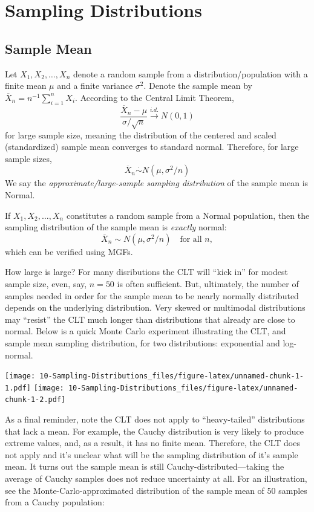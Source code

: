 \documentclass[
]{book}
\begin{document}
\hypertarget{sampling-distributions}{%
\chapter{Sampling Distributions}\label{sampling-distributions}}

\hypertarget{sample-mean}{%
\section{Sample Mean}\label{sample-mean}}

Let \(X_1, X_2, \ldots, X_n\) denote a random sample from a distribution/population with a finite mean \(\mu\) and a finite variance \(\sigma^2\). Denote the sample mean by \(\overline X_n = n^{-1}\sum_{i=1}^n X_i\). According to the Central Limit Theorem,
\[\frac{\overline X_n - \mu}{\sigma / \sqrt{n}} \stackrel{i.d.}{\rightarrow} N(0,1)\]
for large sample size, meaning the distribution of the centered and scaled (standardized) sample mean converges to standard normal. Therefore, for large sample sizes,
\[\overline X_n \stackrel{\cdot}{\sim} N(\mu, \sigma^2/n)\]
We say the \emph{approximate/large-sample sampling distribution} of the sample mean is Normal.

If \(X_1, X_2, \ldots, X_n\) constitutes a random sample from a Normal population, then the sampling distribution of the sample mean is \emph{exactly} normal:
\[\overline X_n \sim N(\mu, \sigma^2/n)\quad \text{for all }n,\]
which can be verified using MGFs.

How large is large? For many disributions the CLT will ``kick in'' for modest sample size, even, say, \(n=50\) is often sufficient. But, ultimately, the number of samples needed in order for the sample mean to be nearly normally distributed depends on the underlying distribution. Very skewed or multimodal distributions may ``resist'' the CLT much longer than distributions that already are close to normal. Below is a quick Monte Carlo experiment illustrating the CLT, and sample mean sampling distribution, for two distributions: exponential and log-normal.

\texttt{[image: 10-Sampling-Distributions\_files/figure-latex/unnamed-chunk-1-1.pdf]} \texttt{[image: 10-Sampling-Distributions\_files/figure-latex/unnamed-chunk-1-2.pdf]}

As a final reminder, note the CLT does not apply to ``heavy-tailed'' distributions that lack a mean. For example, the Cauchy distribution is very likely to produce extreme values, and, as a result, it has no finite mean. Therefore, the CLT does not apply and it's unclear what will be the sampling distribution of it's sample mean. It turns out the sample mean is still Cauchy-distributed---taking the average of Cauchy samples does not reduce uncertainty at all. For an illustration, see the Monte-Carlo-approximated distribution of the sample mean of 50 samples from a Cauchy population:
\end{document}
